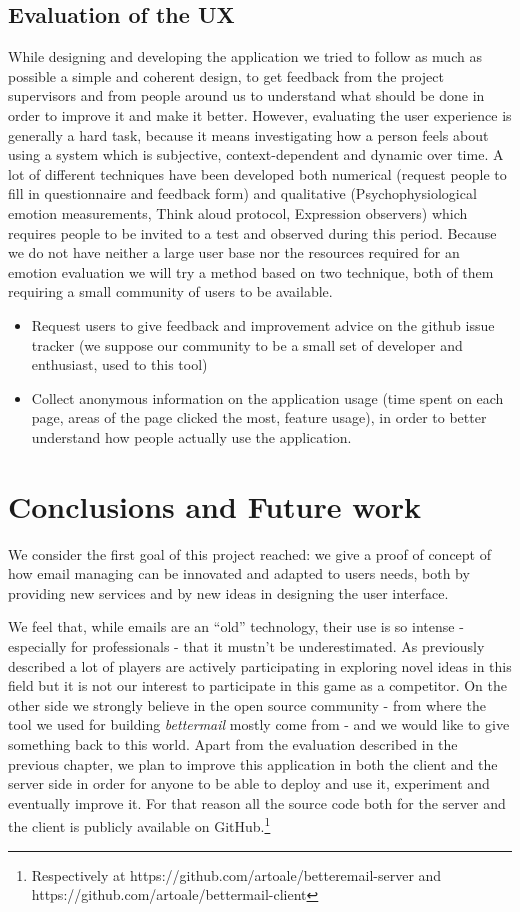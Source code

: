 \documentclass[a4paper,12pt]{report}
\begin{document}

\section{Evaluation of the UX}
While designing and developing the application we tried to follow as much as possible a simple and coherent design, to get feedback from the project supervisors and from people around us to understand what should be done in order to improve it and make it better.
However, evaluating the user experience is generally a hard task, because it means investigating how a person feels about using a system which is subjective, context-dependent and dynamic over time.
A lot of different techniques have been developed both numerical (request people to fill in questionnaire and feedback form) and qualitative (Psychophysiological emotion measurements, Think aloud protocol, Expression observers) which requires people to be invited to a test and observed during this period.
Because we do not have neither a large user base nor the resources required for an emotion evaluation we will try a method based on two technique, both of them requiring a small community of users to be available.
\begin{itemize}
  \item Request users to give feedback and improvement advice on the github issue tracker (we suppose our community to be a small set of developer and enthusiast, used to this tool)
  \item Collect anonymous information on the application usage (time spent on each page, areas of the page clicked the most, feature usage), in order to better understand how people actually use the application.
\end{itemize}

\chapter{Conclusions and Future work}
We consider the first goal of this project reached: we give a proof of concept of how email managing can be innovated and adapted to users needs, both by providing new services and by new ideas in designing the user interface.

We feel that, while emails are an ``old'' technology, their use is so intense - especially for professionals - that it mustn't be underestimated. As previously described a lot of players are actively participating in exploring novel ideas in this field but it is not our interest to participate in this game as a competitor. 
On the other side we strongly believe in the open source community - from where the tool we used for building \emph{bettermail} mostly come from - and we would like to give something back to this world. Apart from the evaluation described in the previous chapter, we plan to improve this application in both the client and the server side in order for anyone to be able to deploy and use it, experiment and eventually improve it. For that reason all the source code both for the server and the client is publicly available on GitHub.\footnote{Respectively at https://github.com/artoale/betteremail-server and https://github.com/artoale/bettermail-client}
\end{document}
